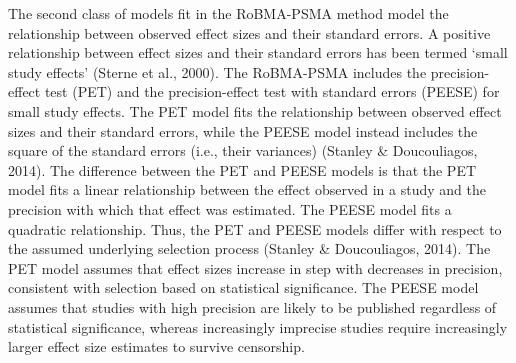 \documentclass[
  man, donotrepeattitle,mask,floatsintext]{apa7}
\begin{document}
The second class of models fit in the RoBMA-PSMA method model the relationship between observed effect sizes and their standard errors. A positive relationship between effect sizes and their standard errors has been termed `small study effects' (Sterne et al., 2000). The RoBMA-PSMA includes the precision-effect test (PET) and the precision-effect test with standard errors (PEESE) for small study effects. The PET model fits the relationship between observed effect sizes and their standard errors, while the PEESE model instead includes the square of the standard errors (i.e., their variances) (Stanley \& Doucouliagos, 2014). The difference between the PET and PEESE models is that the PET model fits a linear relationship between the effect observed in a study and the precision with which that effect was estimated. The PEESE model fits a quadratic relationship. Thus, the PET and PEESE models differ with respect to the assumed underlying selection process (Stanley \& Doucouliagos, 2014). The PET model assumes that effect sizes increase in step with decreases in precision, consistent with selection based on statistical significance. The PEESE model assumes that studies with high precision are likely to be published regardless of statistical significance, whereas increasingly imprecise studies require increasingly larger effect size estimates to survive censorship.
\end{document}
